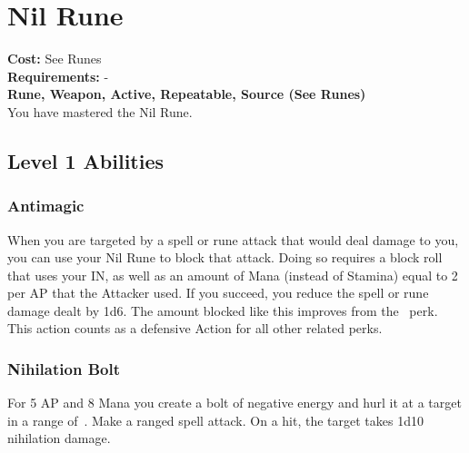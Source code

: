 \section{Nil Rune}\label{rune:nil}
\textbf{Cost:} See Runes\\
\textbf{Requirements:} -\\
\textbf{Rune, Weapon, Active, Repeatable, Source (See Runes)}\\
You have mastered the Nil Rune.

\subsection{Level 1 Abilities}

\subsubsection{Antimagic}
When you are targeted by a spell or rune attack that would deal damage to you, you can use your Nil Rune to block that attack.
Doing so requires a block roll that uses your IN, as well as an amount of Mana (instead of Stamina) equal to 2 per AP that the Attacker used.
If you succeed, you reduce the spell or rune damage dealt by 1d6.
The amount blocked like this improves from the~ perk.
This action counts as a defensive Action for all other related perks.

\subsubsection{Nihilation Bolt}
For 5 AP and 8 Mana you create a bolt of negative energy and hurl it at a target in a range of~.
Make a ranged spell attack.
On a hit, the target takes 1d10 nihilation damage.